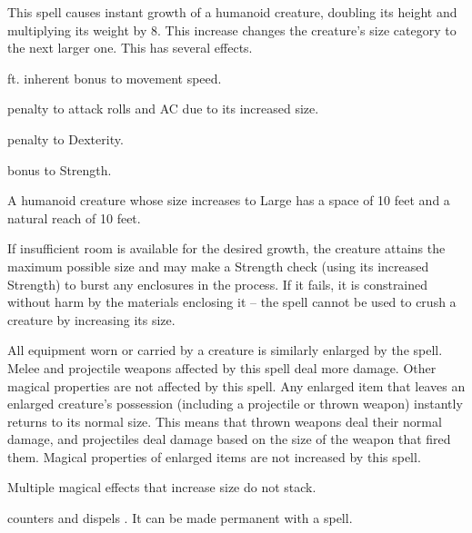 \spellrng{\rngclose}
\begin{spelleffect}
  This spell causes instant growth of a humanoid creature, doubling its height and multiplying its weight by 8. This increase changes the creature's size category to the next larger one. This has several effects.
  \begin{itemize*} 
    \item {} ft. inherent bonus to movement speed.
    \item {} penalty to attack rolls and AC due to its increased size.
  \item {} penalty to Dexterity.
  \item {} bonus to Strength.
  \end{itemize*}
  \par A humanoid creature whose size increases to Large has a space of 10 feet and a natural reach of 10 feet.
  \par If insufficient room is available for the desired growth, the creature attains the maximum possible size and may make a Strength check (using its increased Strength) to burst any enclosures in the process. If it fails, it is constrained without harm by the materials enclosing it -- the spell cannot be used to crush a creature by increasing its size.
  \par All equipment worn or carried by a creature is similarly enlarged by the spell. Melee and projectile weapons affected by this spell deal more damage. Other magical properties are not affected by this spell. Any enlarged item that leaves an enlarged creature's possession (including a projectile or thrown weapon) instantly returns to its normal size. This means that thrown weapons deal their normal damage, and projectiles deal damage based on the size of the weapon that fired them. Magical properties of enlarged items are not increased by this spell.
\end{spelleffect}
\begin{spellnotes}
  Multiple magical effects that increase size do not stack.
  \par {} counters and dispels . It can be made permanent with a  spell.
\end{spellnotes}

